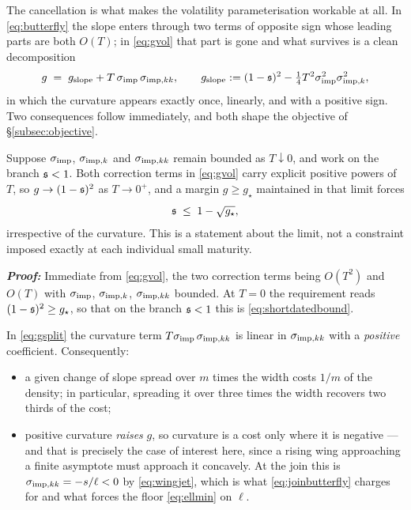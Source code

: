 \medskip

The cancellation is what makes the volatility parameterisation
workable at all. In \eqref{eq:butterfly} the slope enters through two terms of opposite sign whose
leading parts are both $O(T)$; in \eqref{eq:gvol} that part is gone and what survives is a clean
decomposition
\begin{equation}\label{eq:gsplit}
  g \;=\; g_{\mathrm{slope}}+T\,\sigma_{\mathrm{imp}}\,\sigma_{\mathrm{imp},kk},
  \qquad
  g_{\mathrm{slope}}:=(1-\mathfrak{s})^{2}-\tfrac14T^{2}\sigma_{\mathrm{imp}}^{2}\sigma_{\mathrm{imp},k}^{2},
\end{equation}
in which the curvature appears exactly once, linearly, and with a positive sign. Two consequences
follow immediately, and both shape the objective of \S\ref{subsec:objective}.

\begin{proposition}\label{prop:shortdated}
Suppose $\sigma_{\mathrm{imp}}$, $\sigma_{\mathrm{imp},k}$ and $\sigma_{\mathrm{imp},kk}$ remain bounded as $T\downarrow0$, and work on the branch
$\mathfrak{s}<1$. Both correction terms in \eqref{eq:gvol} carry explicit positive powers of $T$, so
$g\to(1-\mathfrak{s})^{2}$ as $T\to0^{+}$, and a margin $g\ge g_{\star}$ maintained in that limit forces
\begin{equation}\label{eq:shortdatedbound}
  \mathfrak{s} \;\le\; 1-\sqrt{g_{\star}},
\end{equation}
irrespective of the curvature. This is a statement about the limit, not a constraint imposed exactly
at each individual small maturity.
\end{proposition}

\textbf{\textit{Proof:}}
Immediate from \eqref{eq:gvol}, the two correction terms being $O(T^{2})$ and $O(T)$ with $\sigma_{\mathrm{imp}}$,
$\sigma_{\mathrm{imp},k}$, $\sigma_{\mathrm{imp},kk}$ bounded. At $T=0$ the requirement reads $(1-\mathfrak{s})^{2}\ge g_{\star}$, so that on
the branch $\mathfrak{s}<1$ this is
\eqref{eq:shortdatedbound}. \qedfilledtext

\begin{remark}\label{prop:curvlinear}
In \eqref{eq:gsplit} the curvature term $T\sigma_{\mathrm{imp}}\,\sigma_{\mathrm{imp},kk}$ is linear in $\sigma_{\mathrm{imp},kk}$ with a
\emph{positive} coefficient. Consequently:
\begin{itemize}
  \item[i)] a given change of slope spread over $m$ times the width costs $1/m$ of the density; in
    particular, spreading it over three times the width recovers two thirds of the cost;
  \item[ii)] positive curvature \emph{raises} $g$, so curvature is a cost only where it is
    negative --- and that is precisely the case of interest here, since a rising wing approaching a
    finite asymptote must approach it concavely. At the join this is $\sigma_{\mathrm{imp},kk}=-s/\ell<0$ by
    \eqref{eq:wingjet},
    which is what \eqref{eq:joinbutterfly} charges for and what forces the floor
    \eqref{eq:ellmin} on $\ell$.
\end{itemize}
\end{remark}

